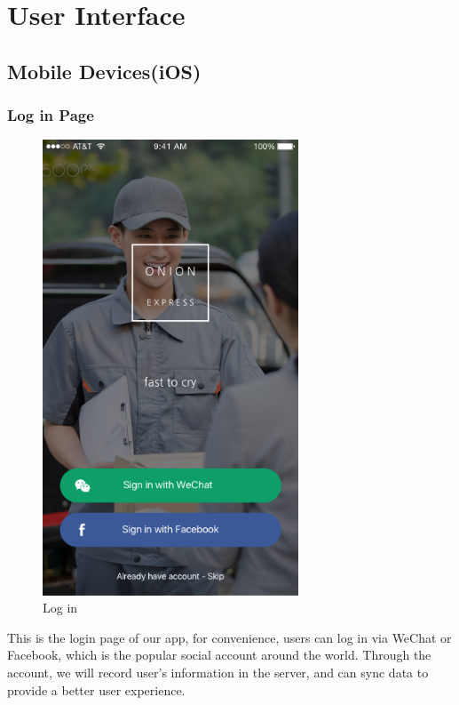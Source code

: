\documentclass[12pt]{scrreprt}
\begin{document}
\chapter{User Interface}
\section{Mobile Devices(iOS)}
\subsection{Log in Page}
\begin{figure}[htbp]
  \centering\includegraphics[width=3in]{DocumentRes/Login.png}
  \caption{Log in}
\end{figure}
This is the login page of our app, for convenience, users can log in via WeChat or Facebook, which is the popular social account around the world. Through the account, we will record user's information in the server, and can sync data to provide a better user experience.
\end{document}
